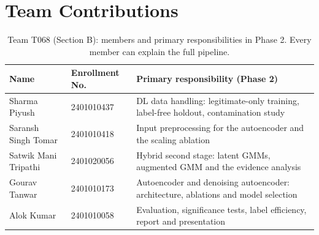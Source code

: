 \documentclass[12pt]{article}
\begin{document}
\section{Team Contributions}
\begin{table}[H]
\centering\small
\caption{Team T068 (Section B): members and primary responsibilities in Phase 2. Every member can explain the full
pipeline.}
\begin{tabularx}{\linewidth}{@{}l l X@{}}
\toprule
\textbf{Name} & \textbf{Enrollment No.} & \textbf{Primary responsibility (Phase 2)}\\
\midrule
Sharma Piyush & 2401010437 & DL data handling: legitimate-only training, label-free holdout, contamination study\\
Saransh Singh Tomar & 2401010418 & Input preprocessing for the autoencoder and the scaling ablation\\
Satwik Mani Tripathi & 2401020056 & Hybrid second stage: latent GMMs, augmented GMM and the evidence analysis\\
Gourav Tanwar & 2401010173 & Autoencoder and denoising autoencoder: architecture, ablations and model selection\\
Alok Kumar & 2401010058 & Evaluation, significance tests, label efficiency, report and presentation\\
\bottomrule
\end{tabularx}
\end{table}
\end{document}
